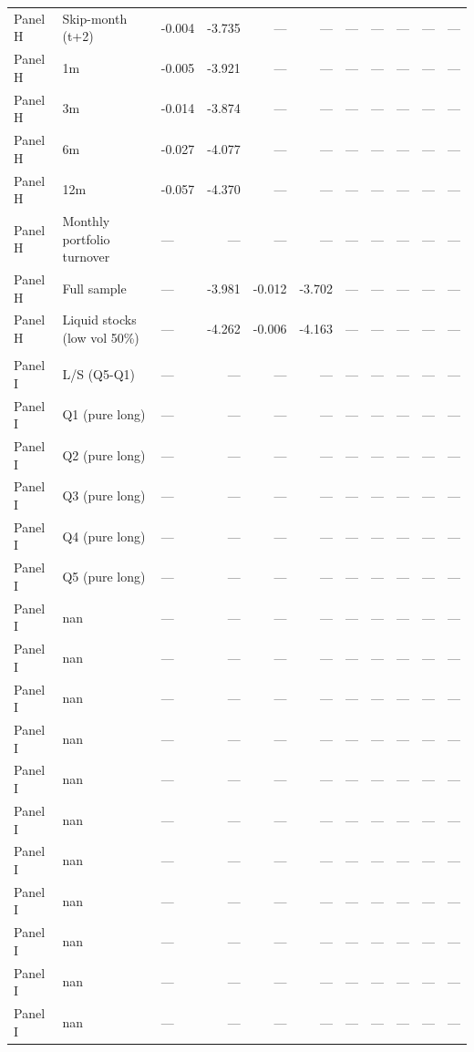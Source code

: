 \begin{longtable}{lllrrrrrrrl}
Panel H & Skip-month (t+2) & -0.004 & -3.735 & — & — & — & — & — & — & — \\
Panel H & 1m & -0.005 & -3.921 & — & — & — & — & — & — & — \\
Panel H & 3m & -0.014 & -3.874 & — & — & — & — & — & — & — \\
Panel H & 6m & -0.027 & -4.077 & — & — & — & — & — & — & — \\
Panel H & 12m & -0.057 & -4.370 & — & — & — & — & — & — & — \\
Panel H & Monthly portfolio turnover & — & — & — & — & — & — & — & — & — \\
Panel H & Full sample & — & -3.981 & -0.012 & -3.702 & — & — & — & — & — \\
Panel H & Liquid stocks (low vol 50\%) & — & -4.262 & -0.006 & -4.163 & — & — & — & — & — \\
\addlinespace
\multicolumn{11}{l}{\textit{Panel I: Economic Significance}} \\
Panel I & L/S (Q5-Q1) & — & — & — & — & — & — & — & — & — \\
Panel I & Q1 (pure long) & — & — & — & — & — & — & — & — & — \\
Panel I & Q2 (pure long) & — & — & — & — & — & — & — & — & — \\
Panel I & Q3 (pure long) & — & — & — & — & — & — & — & — & — \\
Panel I & Q4 (pure long) & — & — & — & — & — & — & — & — & — \\
Panel I & Q5 (pure long) & — & — & — & — & — & — & — & — & — \\
Panel I & nan & — & — & — & — & — & — & — & — & — \\
Panel I & nan & — & — & — & — & — & — & — & — & — \\
Panel I & nan & — & — & — & — & — & — & — & — & — \\
Panel I & nan & — & — & — & — & — & — & — & — & — \\
Panel I & nan & — & — & — & — & — & — & — & — & — \\
Panel I & nan & — & — & — & — & — & — & — & — & — \\
Panel I & nan & — & — & — & — & — & — & — & — & — \\
Panel I & nan & — & — & — & — & — & — & — & — & — \\
Panel I & nan & — & — & — & — & — & — & — & — & — \\
Panel I & nan & — & — & — & — & — & — & — & — & — \\
Panel I & nan & — & — & — & — & — & — & — & — & — \\

\end{longtable}
